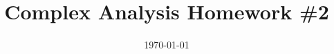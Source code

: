 \documentclass{article}
\date{\today}
\title{Complex Analysis Homework \#2}
\begin{document}
\maketitle

\begin{prob}
\end{prob}
\end{document}
